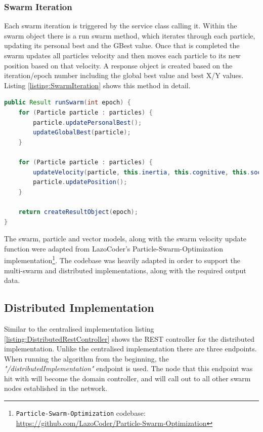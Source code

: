 \documentclass[oneside,12pt]{book}
\begin{document}
\subsubsection{Swarm Iteration}
Each swarm iteration is triggered by the service class calling it. Within the swarm object there is a run swarm method, which iterates through each particle, updating its personal best and the GBest value. Once that is completed the swarm updates all particles velocity and then moves each particle to its new position based on that velocity. A response object is created based on the iteration/epoch number including the global best value and best X/Y values. Listing \ref{listing:SwarmIteration} shows this method in detail. 
\begin{lstlisting}[basicstyle=\footnotesize, language=Java]
public Result runSwarm(int epoch) {
    for (Particle particle : particles) {
        particle.updatePersonalBest();
        updateGlobalBest(particle);
    }

    for (Particle particle : particles) {
        updateVelocity(particle, this.inertia, this.cognitive, this.social);
        particle.updatePosition();
    }

    return createResultObject(epoch);
}
\end{lstlisting}
\label{listing:SwarmIteration}

The swarm, particle and vector models, along with the swarm velocity update function were adapted from LazoCoder's Particle-Swarm-Optimization implementation\footnote{\texttt{Particle-Swarm-Optimization} codebase: \url{https://github.com/LazoCoder/Particle-Swarm-Optimization}}. The codebase was heavily adapted in order to support the multi-swarm and distributed implementations, along with the required output data. 

\subsection{Distributed Implementation}
Similar to the centralised implementation listing \ref{listing:DistributedRestController} shows the REST controller for the distributed implementation. Unlike the centralised implementation there are three endpoints. When running the algorithm from the beginning, the \textit{"/distributedImplementation"} endpoint is used. The node that this endpoint was hit with will become the domain controller, and will call out to all other swarm nodes established in the network.
\end{document}
